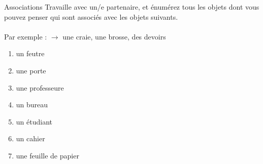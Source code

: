 \begin{frame}{Associations }
  Travaille avec un/e partenaire, et énumérez tous les objets dont vous pouvez penser qui sont associés avec les objets suivants. \\
   \\
  Par exemple :  $\to$ une craie, une brosse, des devoirs
  \begin{enumerate}
    \item un feutre
    \item une porte
    \item une professeure
    \item un bureau
    \item un étudiant
    \item un cahier
    \item une feuille de papier
  \end{enumerate}
\end{frame}